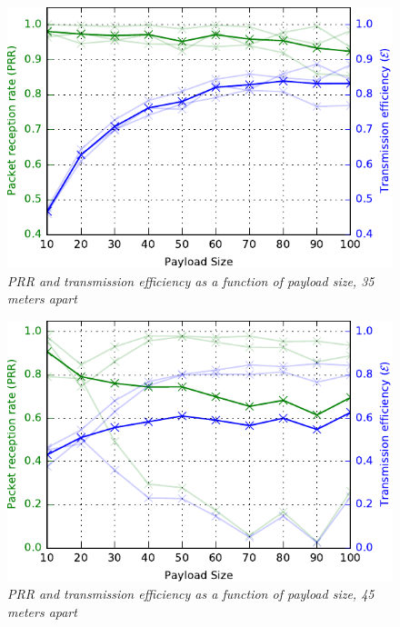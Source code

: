 \begin{figure}
\centering
\includegraphics[scale=1]{figs/35mTest.pdf} 
\caption{\textit{PRR and transmission efficiency as a function of payload size, 35 meters apart}\label{fig:35mTest}}
\end{figure}

\begin{figure}
\centering
\includegraphics[scale=1]{figs/45mTest.pdf} 
\caption{\textit{PRR and transmission efficiency as a function of payload size, 45 meters apart}\label{fig:45mTest}}
\end{figure}
